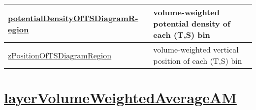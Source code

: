 {\begin{center}
\begin{longtable}{| p{2.0in} | p{4.0in} |}
    \hline
    \hyperref[subsec:var_sec_waterMassCensusAM_potentialDensityOfTSDiagramRegion]{potentialDensityOfTSDiagramR-}\hyperref[subsec:var_sec_waterMassCensusAM_potentialDensityOfTSDiagramRegion]{egion  }& volume-weighted potential density of each (T,S) bin \\
    \hline
    \hyperref[subsec:var_sec_waterMassCensusAM_zPositionOfTSDiagramRegion]{zPositionOfTSDiagramRegion} & volume-weighted vertical position of each (T,S) bin \\
    \hline
\end{longtable}
\end{center}
}
\section[layerVolumeWeightedAverageAM]{\hyperref[sec:var_sec_layerVolumeWeightedAverageAM]{layerVolumeWeightedAverageAM}}
\label{sec:var_tab_layerVolumeWeightedAverageAM}
\vspace{0.5in}
